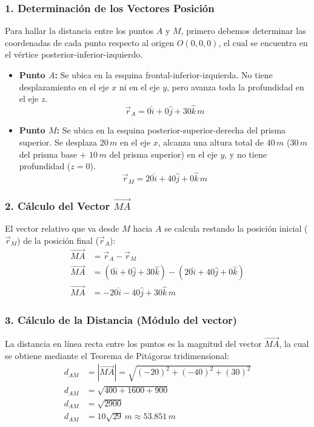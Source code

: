 \documentclass[12pt, a4paper]{article}
\begin{document}
\subsubsection*{1. Determinación de los Vectores Posición}
Para hallar la distancia entre los puntos $A$ y $M$, primero debemos determinar las coordenadas de cada punto respecto al origen $O(0,0,0)$, el cual se encuentra en el vértice posterior-inferior-izquierdo.

\begin{itemize}
    \item \textbf{Punto $A$:} Se ubica en la esquina frontal-inferior-izquierda. No tiene desplazamiento en el eje $x$ ni en el eje $y$, pero avanza toda la profundidad en el eje $z$.
    $$ \vec{r}_A = 0\hat{i} + 0\hat{j} + 30\hat{k} \, \si{m} $$
    \item \textbf{Punto $M$:} Se ubica en la esquina posterior-superior-derecha del prisma superior. Se desplaza $20 \, \si{m}$ en el eje $x$, alcanza una altura total de $40 \, \si{m}$ ($30 \, \si{m}$ del prisma base + $10 \, \si{m}$ del prisma superior) en el eje $y$, y no tiene profundidad ($z=0$).
    $$ \vec{r}_M = 20\hat{i} + 40\hat{j} + 0\hat{k} \, \si{m} $$
\end{itemize}

\subsubsection*{2. Cálculo del Vector $\vec{MA}$}
El vector relativo que va desde $M$ hacia $A$ se calcula restando la posición inicial ($\vec{r}_M$) de la posición final ($\vec{r}_A$):
\begin{align*}
    \vec{MA} &= \vec{r}_A - \vec{r}_M \\
    \vec{MA} &= (0\hat{i} + 0\hat{j} + 30\hat{k}) - (20\hat{i} + 40\hat{j} + 0\hat{k}) \\
    \vec{MA} &= -20\hat{i} - 40\hat{j} + 30\hat{k} \, \si{m}
\end{align*}

\subsubsection*{3. Cálculo de la Distancia (Módulo del vector)}
La distancia en línea recta entre los puntos es la magnitud del vector $\vec{MA}$, la cual se obtiene mediante el Teorema de Pitágoras tridimensional:
\begin{align*}
    d_{AM} &= |\vec{MA}| = \sqrt{(-20)^2 + (-40)^2 + (30)^2} \\
    d_{AM} &= \sqrt{400 + 1600 + 900} \\
    d_{AM} &= \sqrt{2900} \\
    d_{AM} &= 10\sqrt{29} \, \si{m} \approx 53.851 \, \si{m}
\end{align*}
\end{document}
